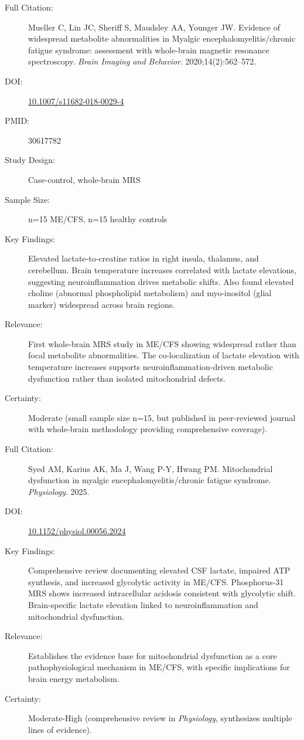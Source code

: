 \begin{description}
    \item[Full Citation:] Mueller C, Lin JC, Sheriff S, Maudsley AA, Younger JW. Evidence of widespread metabolite abnormalities in Myalgic encephalomyelitis/chronic fatigue syndrome: assessment with whole-brain magnetic resonance spectroscopy. \textit{Brain Imaging and Behavior}. 2020;14(2):562--572.
    \item[DOI:] \href{https://doi.org/10.1007/s11682-018-0029-4}{10.1007/s11682-018-0029-4}
    \item[PMID:] 30617782
    \item[Study Design:] Case-control, whole-brain MRS
    \item[Sample Size:] n=15 ME/CFS, n=15 healthy controls
    \item[Key Findings:] Elevated lactate-to-creatine ratios in right insula, thalamus, and cerebellum. Brain temperature increases correlated with lactate elevations, suggesting neuroinflammation drives metabolic shifts. Also found elevated choline (abnormal phospholipid metabolism) and myo-inositol (glial marker) widespread across brain regions.
    \item[Relevance:] First whole-brain MRS study in ME/CFS showing widespread rather than focal metabolite abnormalities. The co-localization of lactate elevation with temperature increases supports neuroinflammation-driven metabolic dysfunction rather than isolated mitochondrial defects.
    \item[Certainty:] Moderate (small sample size n=15, but published in peer-reviewed journal with whole-brain methodology providing comprehensive coverage).
\end{description}

\begin{description}
    \item[Full Citation:] Syed AM, Karius AK, Ma J, Wang P-Y, Hwang PM. Mitochondrial dysfunction in myalgic encephalomyelitis/chronic fatigue syndrome. \textit{Physiology}. 2025.
    \item[DOI:] \href{https://doi.org/10.1152/physiol.00056.2024}{10.1152/physiol.00056.2024}
    \item[Key Findings:] Comprehensive review documenting elevated CSF lactate, impaired ATP synthesis, and increased glycolytic activity in ME/CFS. Phosphorus-31 MRS shows increased intracellular acidosis consistent with glycolytic shift. Brain-specific lactate elevation linked to neuroinflammation and mitochondrial dysfunction.
    \item[Relevance:] Establishes the evidence base for mitochondrial dysfunction as a core pathophysiological mechanism in ME/CFS, with specific implications for brain energy metabolism.
    \item[Certainty:] Moderate-High (comprehensive review in \textit{Physiology}, synthesizes multiple lines of evidence).
\end{description}

